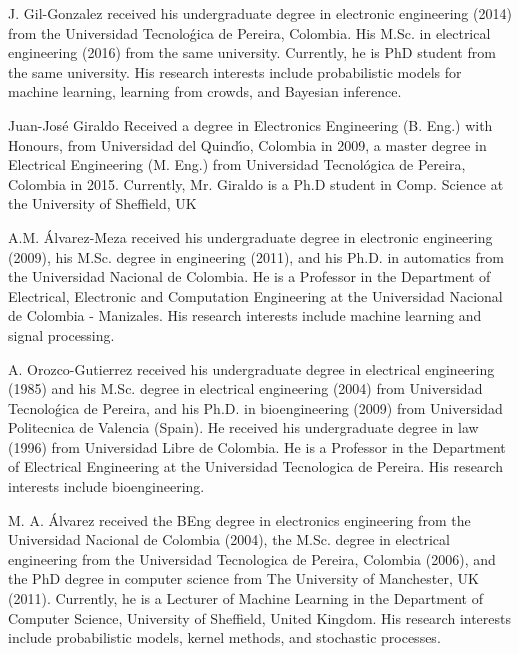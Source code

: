 \documentclass[journal]{IEEEtran}
\begin{document}
\vspace{-1.0cm}
\begin{IEEEbiographynophoto}{J. Gil-Gonzalez}
received his undergraduate degree in electronic engineering (2014) from the Universidad Tecnoloǵica de Pereira, Colombia. His M.Sc. in electrical engineering (2016) from the same university. Currently, he is PhD student from the same university. His research interests include probabilistic models for machine learning, learning from crowds, and Bayesian inference.
\end{IEEEbiographynophoto}
\vspace{-1.0cm}
\begin{IEEEbiographynophoto}{Juan-José Giraldo}
Received a degree in Electronics Engineering (B. Eng.)
with Honours, from Universidad del Quindı́o, Colombia in 2009, a master degree in Electrical Engineering (M. Eng.) from Universidad Tecnológica de Pereira, Colombia in 2015. Currently, Mr. Giraldo is a Ph.D student in Comp. Science at the University of Sheffield, UK
\end{IEEEbiographynophoto}
\vspace{-1.0cm}
\begin{IEEEbiographynophoto}{A.M. Álvarez-Meza}
received his undergraduate degree in electronic engineering (2009), his M.Sc. degree in engineering (2011), and his Ph.D. in automatics from the Universidad Nacional de Colombia. He is a Professor in the Department of Electrical, Electronic and Computation Engineering at the Universidad Nacional de Colombia - Manizales. His research interests include machine learning and signal processing.
\end{IEEEbiographynophoto}
\vspace{-1.0cm}
\begin{IEEEbiographynophoto}{A. Orozco-Gutierrez}
received his undergraduate degree in electrical engineering (1985) and his M.Sc. degree in electrical engineering (2004) from Universidad Tecnoloǵica de Pereira, and his Ph.D. in bioengineering (2009) from Universidad Politecnica de Valencia (Spain). He received his undergraduate degree in law (1996) from Universidad Libre de Colombia. He is a Professor in the Department of Electrical Engineering at the Universidad Tecnologica de Pereira. His research interests include bioengineering.
\end{IEEEbiographynophoto}
\vspace{-1.0cm}
\begin{IEEEbiographynophoto}{M. A. Álvarez}
received the BEng degree in electronics engineering from the Universidad Nacional de Colombia (2004), the M.Sc. degree
in electrical engineering from the Universidad Tecnologica de Pereira, Colombia (2006), and the PhD degree in computer science from The University of Manchester, UK (2011). Currently, he is a Lecturer of Machine Learning in the Department of Computer Science, University of Sheffield, United Kingdom. His research interests include probabilistic models, kernel methods, and stochastic processes.
\end{IEEEbiographynophoto}
\end{document}
